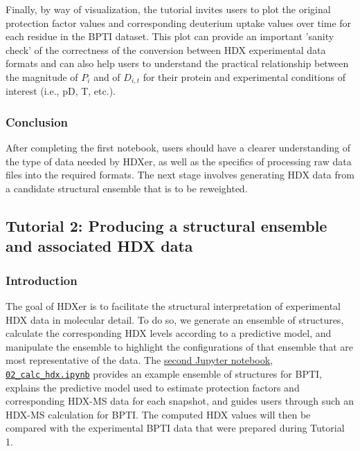 \documentclass[9pt,tutorial,ASAPversion]{livecoms}
\begin{document}
Finally, by way of visualization, the tutorial invites users to plot the original protection factor values and corresponding deuterium uptake values over time for each residue in the BPTI dataset.
This plot can provide an important 'sanity check' of the correctness of the conversion between HDX experimental data formats and can also help users to understand the practical relationship between the magnitude of $P_i$ and of $D_{i,t}$ for their protein and experimental conditions of interest (i.e., pD, T, etc.).

\subsubsection{Conclusion}
After completing the first notebook, users should have a clearer understanding of the type of data needed by HDXer, as well as the specifics of processing raw data files into the required formats. 
The next stage involves generating HDX data from a candidate structural ensemble that is to be reweighted.

\subsection{Tutorial 2: Producing a structural ensemble and associated HDX data}\label{tutorial_2}

\subsubsection{Introduction}
The goal of HDXer is to facilitate the structural interpretation of experimental HDX data in molecular detail. 
To do so, we generate an ensemble of structures, calculate the corresponding HDX levels according to a predictive model, and manipulate the ensemble to highlight the configurations of that ensemble that are most representative of the data. 
The \href{https://github.com/Lucy-Forrest-Lab/HDXer/blob/master/tutorials/notebooks/02_calc_hdx.ipynb}{second Jupyter notebook}, \href{https://github.com/Lucy-Forrest-Lab/HDXer/blob/master/tutorials/notebooks/02_calc_hdx.ipynb}{\texttt{02\_calc\_hdx.ipynb}} provides an example ensemble of structures for BPTI, explains the predictive model used to estimate protection factors and corresponding HDX-MS data for each snapshot, and guides users through such an HDX-MS calculation for BPTI.
The computed HDX values will then be compared with the experimental BPTI data that were prepared during Tutorial 1.
\end{document}

